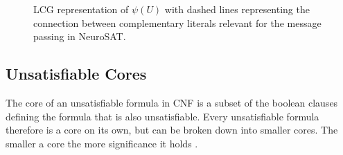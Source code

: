 \begin{figure}[h]
    \centering
    \caption[Bipartite graph in LCG]{LCG representation of $\psi(U)$ with dashed lines representing the connection between complementary literals relevant for the message passing in NeuroSAT.}
    \label{fig:lcg-sat}
\end{figure}


\subsection{Unsatisfiable Cores}
The core of an unsatisfiable formula in CNF is a subset of the boolean clauses defining the formula that is also unsatisfiable. Every unsatisfiable formula therefore is a core on its own, but can be broken down into smaller cores. The smaller a core the more significance it holds \cite{10.1007/978-3-540-68237-0_23}. 

